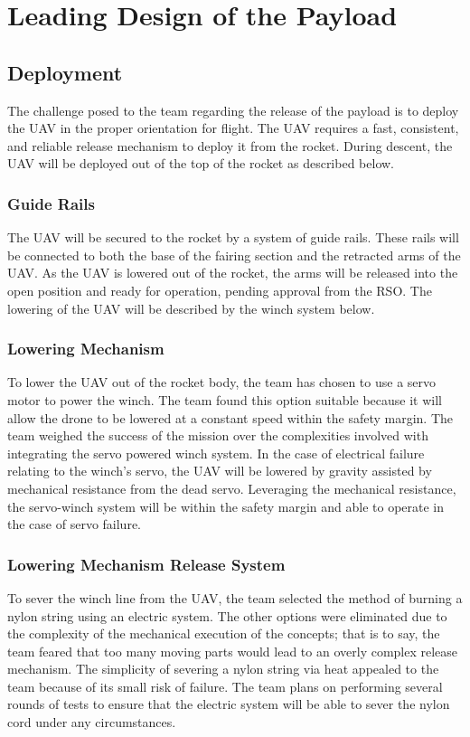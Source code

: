 \chapter{Leading Design of the Payload}

	\section{Deployment}\label{PL:Design:Deployment}
		The challenge posed to the team regarding the release of the payload is to deploy the UAV in the proper orientation for flight. The UAV requires a fast, consistent, and reliable release mechanism to deploy it from the rocket. During descent, the UAV will be deployed out of the top of the rocket as described below. 
		\subsection{Guide Rails}
			The UAV will be secured to the rocket by a system of guide rails. These rails will be connected to both the base of the fairing section and the retracted arms of the UAV. As the UAV is lowered out of the rocket, the arms will be released into the open position and ready for operation, pending approval from the RSO. The lowering of the UAV will be described by the winch system below.  

			\subsection{Lowering Mechanism}
				To lower the UAV out of the rocket body, the team has chosen to use a servo motor to power the winch. The team found this option suitable because it will allow the drone to be lowered at a constant speed within the safety margin. The team weighed the success of the mission over the complexities involved with integrating the servo powered winch system. In the case of electrical failure relating to the winch’s servo, the UAV will be lowered by gravity assisted by mechanical resistance from the dead servo. Leveraging the mechanical resistance, the servo-winch system will be within the safety margin and able to operate in the case of servo failure.

			\subsection{Lowering Mechanism Release System}
				To sever the winch line from the UAV, the team selected the method of burning a nylon string using an electric system. The other options were eliminated due to the complexity of the mechanical execution of the concepts; that is to say, the team feared that too many moving parts would lead to an overly complex release mechanism. The simplicity of severing a nylon string via heat appealed to the team because of its small risk of failure. The team plans on performing several rounds of tests to ensure that the electric system will be able to sever the nylon cord under any circumstances. 


